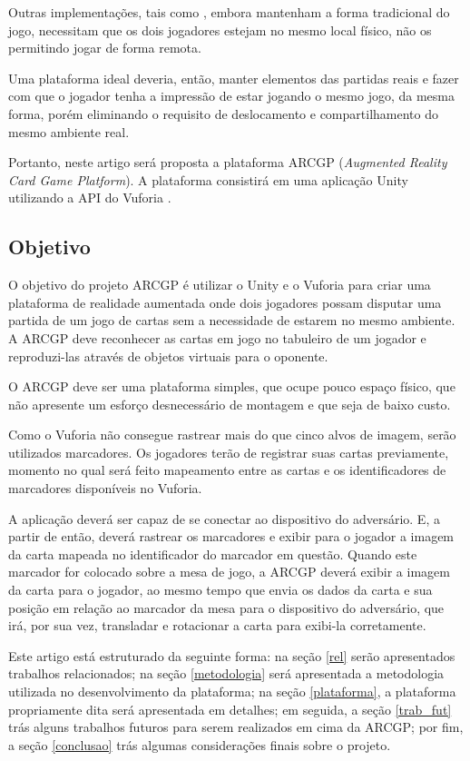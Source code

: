 \documentclass[conference]{IEEEtran}
\begin{document}
Outras implementações, tais como \cite{joao}, embora mantenham a forma 
tradicional do jogo, necessitam que os dois jogadores estejam no mesmo local 
físico, não os permitindo jogar de forma remota.

Uma plataforma ideal deveria, então, manter elementos das partidas reais e fazer 
com que o jogador tenha a impressão de estar jogando o mesmo jogo, da mesma 
forma, porém eliminando o requisito de deslocamento e compartilhamento do mesmo 
ambiente real.

Portanto, neste artigo será proposta a plataforma ARCGP (\textit{Augmented 
Reality Card Game Platform}). A plataforma consistirá em uma aplicação 
Unity \cite{unity} utilizando a API do Vuforia \cite{vuforia}. 

\subsection{Objetivo}
\label{objetivo}
O objetivo do projeto ARCGP é utilizar o Unity e o Vuforia para criar uma 
plataforma de realidade aumentada onde dois jogadores possam disputar uma 
partida de um jogo de cartas sem a necessidade de estarem no mesmo ambiente. 
A ARCGP deve reconhecer as cartas em jogo no tabuleiro de um jogador e 
reproduzi-las através de objetos virtuais para o oponente.

O ARCGP deve ser uma plataforma simples, que ocupe pouco espaço físico, que não 
apresente um esforço desnecessário de montagem e que seja de baixo custo.

Como o Vuforia não consegue rastrear mais do que cinco alvos de imagem, serão 
utilizados marcadores. Os jogadores terão de registrar suas cartas previamente, 
momento no qual será feito mapeamento entre as cartas e os identificadores de 
marcadores disponíveis no Vuforia.

A aplicação deverá ser capaz de se conectar ao dispositivo do adversário. E, a 
partir de então, deverá rastrear os marcadores e exibir para o jogador a imagem 
da carta mapeada no identificador do marcador em questão. Quando este marcador 
for colocado sobre a mesa de jogo, a ARCGP deverá exibir a imagem da carta para 
o jogador, ao mesmo tempo que envia os dados da carta e sua posição em relação 
ao marcador da mesa para o dispositivo do adversário, que irá, por sua vez, 
transladar e rotacionar a carta para exibi-la corretamente.

Este artigo está estruturado da seguinte forma: na seção \ref{rel} serão 
apresentados trabalhos relacionados; na seção \ref{metodologia} será 
apresentada a metodologia utilizada no desenvolvimento da plataforma; na 
seção \ref{plataforma}, a plataforma propriamente dita será apresentada em 
detalhes; em seguida, a seção \ref{trab_fut} trás alguns trabalhos futuros 
para serem realizados em cima da ARCGP; por fim, a seção \ref{conclusao} trás 
algumas considerações finais sobre o projeto.
\end{document}
